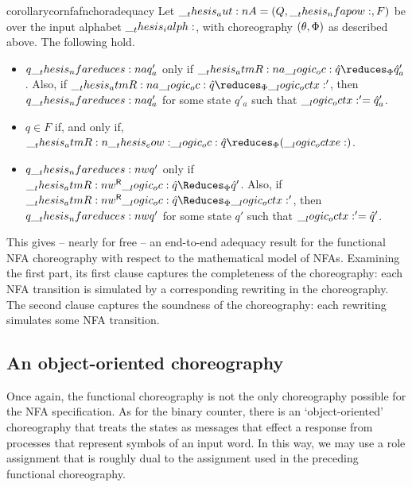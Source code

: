 %
\begin{restatable}[
  name=Adequacy of the functional \acs*{NFA} choreography,
  label=cor:formula-as-process:nfa-fnchor-adequacy
]{corollary}{cornfafnchoradequacy}
  Let $\__thesis_aut:n {A} = (Q, \__thesis_nfapow:, F)$ be  over the input alphabet $\__thesis_ialph:$, with choreography $(\theta, \Phi)$ as described above.
  The following hold.
  \begin{itemize}[nosep]
  \item
    $q \nfareduces[a] q'_a$ only if $\atmR{a} \oc \defp{q} \reduces_{\orsig} \defp{q}'_a$.
    Also, if $\atmR{a} \oc \defp{q} \reduces_{\orsig} \octx'$, then $q \nfareduces[a] q'_a$ for some state $q'_a$ such that $\__logic_octx:' = \hat{q}'_a$.
  \item
    $q \in F$ if, and only if, $\atmR{\eow} \oc \defp{q} \reduces_{\orsig} (\octxe)$.
  \item
    $q \nfareduces[w] q'$ only if $\rev{\atmR{w}} \oc \defp{q} \Reduces_{\orsig} \defp{q}'$.
    Also, if $\rev{\atmR{w}} \oc \defp{q} \Reduces_{\orsig} \octx'$, then $q \nfareduces[w] q'$ for some state $q'$ such that $\__logic_octx:' = \hat{q}'$.
  \end{itemize}
\end{restatable}
\noindent
This  gives -- nearly for free -- an end-to-end adequacy result for the functional \ac{NFA} choreography with respect to the mathematical model of \acp{NFA}.
Examining the first part, its first clause captures the completeness of the choreography: each \ac{NFA} transition is simulated by a corresponding rewriting in the choreography.
The second clause captures the soundness of the choreography: each rewriting simulates some \ac{NFA} transition.



\subsection{An object-oriented choreography}\label{sec:formula-as-process:nfa-oo}

Once again, the functional choreography is not the only choreography possible for the \ac{NFA} specification.
As for the binary counter, there is an \enquote*{object-oriented} choreography that treats the states as messages that effect a response from processes that represent symbols of an input word.
In this way, we may use a role assignment that is roughly dual to the assignment used in the preceding functional choreography.

